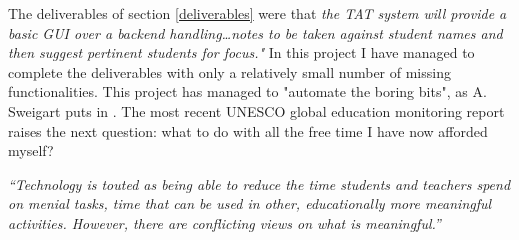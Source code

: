 \documentclass[10pt]{article}
\begin{document}
The deliverables of section \ref{deliverables} were that \emph{the TAT system will provide a basic GUI over a backend handling\ldots notes to be taken against student names and then suggest pertinent students for focus."} In this project I have managed to complete the deliverables with only a relatively small number of missing functionalities. This project has managed to "automate the boring bits", as A. Sweigart puts in \cite{Swei15}. The most recent UNESCO global education monitoring report raises the next question: what to do with all the free time I have now afforded myself?
\begin{center} 
\emph{``Technology is touted as being able to reduce the time students and teachers spend on menial tasks, time that can be used in other, educationally more meaningful activities. However, there are conflicting views on what is meaningful.''} \cite[p. 11]{Unesco23}
\end{center}
\end{document}

